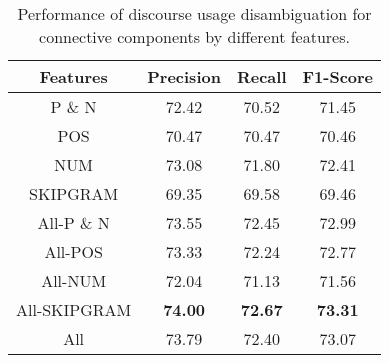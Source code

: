 \begin{table}[ht]
\centering
\begin{tabular}{|c|c|c|c|}
\hline

\bf Features            & \bf Precision & \bf Recall & \bf F1-Score \\ \hline
    P \& N              &     72.42     &     70.52  &     71.45    \\ \hline
    POS                 &     70.47     &     70.47  &     70.46    \\ \hline
    NUM                 &     73.08     &     71.80  &     72.41    \\ \hline
    SKIPGRAM            &     69.35     &     69.58  &     69.46    \\ \hline
    All-P \& N          &     73.55     &     72.45  &     72.99    \\ \hline
    All-POS             &     73.33     &     72.24  &     72.77    \\ \hline
    All-NUM             &     72.04     &     71.13  &     71.56    \\ \hline
    All-SKIPGRAM        & \bf 74.00     & \bf 72.67  & \bf 73.31    \\ \hline
    All                 &     73.79     &     72.40  &     73.07    \\ \hline

\end{tabular}
\caption{\label{t:sense-features} Performance of discourse usage
disambiguation for connective components by different features. }
\end{table}
